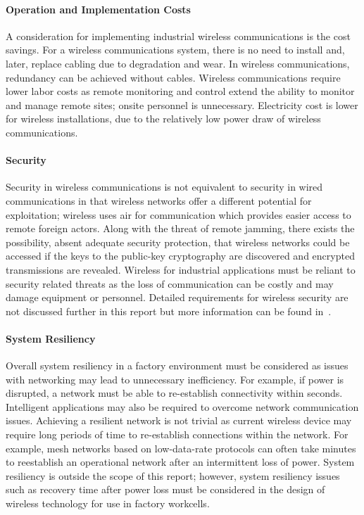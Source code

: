 \paragraph{Operation and Implementation Costs}
A consideration for implementing industrial wireless communications is the cost savings. For a wireless communications system, there is no need to install and, later, replace cabling due to degradation and wear. In wireless communications, redundancy can be achieved without cables. Wireless communications require lower labor costs as remote monitoring and control extend the ability to monitor and manage remote sites; onsite personnel is unnecessary. Electricity cost is lower for wireless installations, due to the relatively low power draw of wireless communications.

\paragraph{Security}
Security in wireless communications is not equivalent to security in wired communications in that wireless networks offer a different potential for exploitation; wireless uses air for communication which provides easier access to remote foreign actors. Along with the threat of remote jamming, there exists the possibility, absent adequate security protection, that wireless networks could be accessed if the keys to the public-key cryptography are discovered and encrypted transmissions are revealed. Wireless for industrial applications must be reliant to security related threats as the loss of communication can be costly and may damage equipment or personnel. Detailed requirements for wireless security are not discussed further in this report but more information can be found in~\cite{Stouffer2015}.

\paragraph{System Resiliency}
Overall system resiliency in a factory environment must be considered as issues with networking may lead to unnecessary inefficiency. For example, if power is disrupted, a network must be able to re-establish connectivity within seconds. Intelligent applications may also be required to overcome network communication issues. Achieving a resilient network is not trivial as current wireless device may require long periods of time to re-establish connections within the network.  For example, mesh networks based on low-data-rate protocols can often take minutes to reestablish an operational network after an intermittent loss of power.  System resiliency is outside the scope of this report; however, system resiliency issues such as recovery time after power loss must be considered in the design of wireless technology for use in factory workcells.


